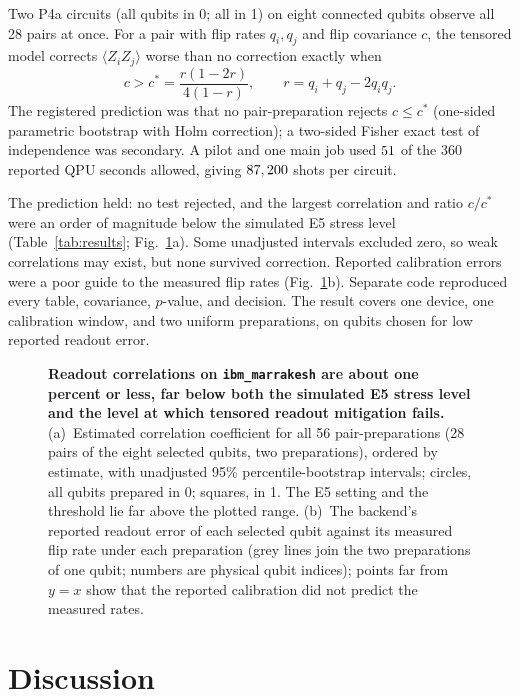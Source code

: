 \documentclass[10pt,twocolumn]{article}
\newcommand{\code}[1]{\texttt{#1}}
\begin{document}
Two P4a circuits (all qubits in 0; all in 1) on eight connected qubits observe
all 28 pairs at once. For a pair with flip rates $q_i,q_j$ and flip covariance
$c$, the tensored model corrects $\langle Z_iZ_j\rangle$ worse than no
correction exactly when
\begin{equation}
c > c^\ast=\frac{r(1-2r)}{4(1-r)},\qquad r=q_i+q_j-2q_iq_j .
\end{equation}
The registered prediction was that no pair-preparation rejects $c\le c^\ast$
(one-sided parametric bootstrap with Holm correction\cite{holm1979}); a
two-sided Fisher exact test of independence\cite{fisher1935} was secondary.
A pilot and one main job used $51$ of the 360 reported QPU seconds
allowed, giving $87,200$ shots per circuit.

The prediction held: no test rejected, and the largest correlation and ratio
$c/c^\ast$ were an order of magnitude below the simulated E5 stress level
(Table~\ref{tab:results}; Fig.~\ref{fig:hw}a). Some unadjusted intervals
excluded zero, so weak correlations may exist, but none survived correction.
Reported calibration errors were a poor guide to the measured flip rates
(Fig.~\ref{fig:hw}b). Separate code reproduced every table, covariance,
$p$-value, and decision. The result covers one device, one calibration window,
and two uniform preparations, on qubits chosen for low reported readout error.

\begin{figure}[t]
\centering

\caption{\textbf{Readout correlations on \code{ibm\_marrakesh} are about one
percent or less, far below both the simulated E5 stress level and the level at
which tensored readout mitigation fails.} (a)~Estimated correlation
coefficient for all 56 pair-preparations (28 pairs of the eight selected
qubits, two preparations), ordered by estimate, with unadjusted 95\%
percentile-bootstrap intervals; circles, all qubits prepared in 0; squares,
in 1. The E5 setting and the threshold lie far above the plotted range. (b)~The backend's
reported readout error of each selected qubit against its measured flip rate
under each preparation (grey lines join the two preparations of one qubit; numbers are physical
qubit indices); points far from $y=x$ show that the reported calibration did not predict the
measured rates.}
\label{fig:hw}
\end{figure}

\section{Discussion}
\end{document}
